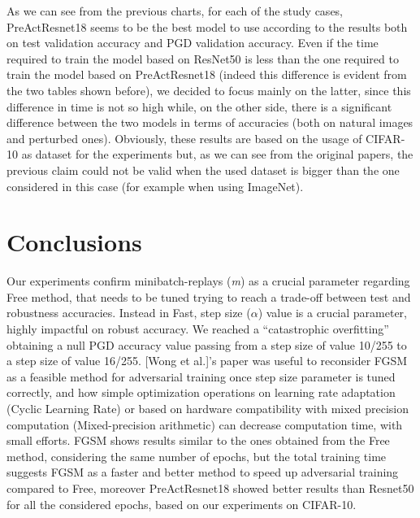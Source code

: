 \documentclass{article}
\begin{document}
As we can see from the previous charts, for each of the study cases, PreActResnet18 seems to be the best model to use according to the results both on test validation accuracy and PGD validation accuracy. Even if the time required to train the model based on ResNet50 is less than the one required to train the model based on PreActResnet18 (indeed this difference is evident from the two tables shown before), we decided to focus mainly on the latter, since this difference in time is not so high while, on the other side, there is a significant difference between the two models in terms of accuracies (both on natural images and perturbed ones). Obviously, these results are based on the usage of CIFAR-10 as dataset for the experiments but, as we can see from the original papers, the previous claim could not be valid when the used dataset is bigger than the one considered in this case (for example when using ImageNet).

\newpage
\section{Conclusions}
Our experiments confirm minibatch-replays (\textit{m}) as a crucial parameter regarding Free method, that needs to be tuned trying to reach a trade-off between test and robustness accuracies. Instead in Fast, step size ($\alpha$) value is a crucial parameter, highly impactful on robust accuracy. We reached a “catastrophic overfitting” obtaining a null PGD accuracy value passing from a step size of value 10/255 to a step size of value 16/255. 
[Wong et al.]'s paper \cite{WongEtAl2020} was useful to reconsider FGSM as a
feasible method for adversarial training once step size parameter is tuned
correctly, and how simple optimization operations on learning rate adaptation
(Cyclic Learning Rate) or based on hardware compatibility with mixed precision
computation (Mixed-precision arithmetic) can decrease computation time, with
small efforts. FGSM shows results similar to the ones obtained from the Free
method, considering the same number of epochs, but the total training time
suggests FGSM as a faster and better method to speed up adversarial training
compared to Free, moreover PreActResnet18 showed better results than Resnet50 for all the considered epochs, based on our experiments on CIFAR-10.   
\end{document}
